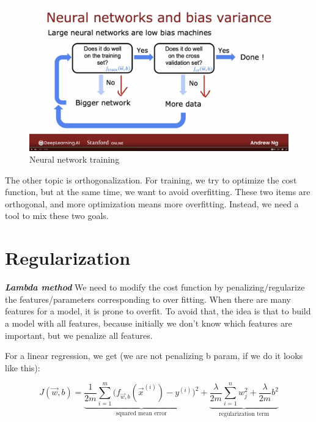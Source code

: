 \documentclass[12pt]{report}
\begin{document}
\begin{figure}[H]
  \centering
  \caption{Neural network training}
  \includegraphics[trim =0.0cm 0.0cm 0.0cm 0.0cm, clip, scale=0.12]{pics/nn.png}
\end{figure}

The other topic is orthogonalization. For training, we try to optimize the cost function, but at the same time, we want to avoid overfitting. These two items are orthogonal, and more optimization means more overfitting. Instead, we need a tool to mix these two goals.


\section{Regularization}
\label{sec:regularization}


\textbf{\textit{Lambda method}}
We need to modify the cost function by penalizing/regularize the features/parameters corresponding to over fitting. When there are many features for a model, it is prone to overfit. To avoid that, the idea is that to build a model with all features, because initially we don't know which features are important, but we penalize all features.

For a linear regression, we get (we are not penalizing b param, if we do it looks like this):

\begin{equation}
J(\overrightarrow{w},b) = \underbrace{  \frac{1}{2m} \sum_{i=1}^{m} \big( f_{\overrightarrow{w},b} (\overrightarrow{x}^{(i)}) - y^{(i)} \big) ^2}_\text{squared mean error} + \underbrace{ \frac{\lambda}{2m} \sum_{i=1}^n w_j^2 + \frac{\lambda}{2m} b^2}_\text{regularization term}
\end{equation}
\end{document}
